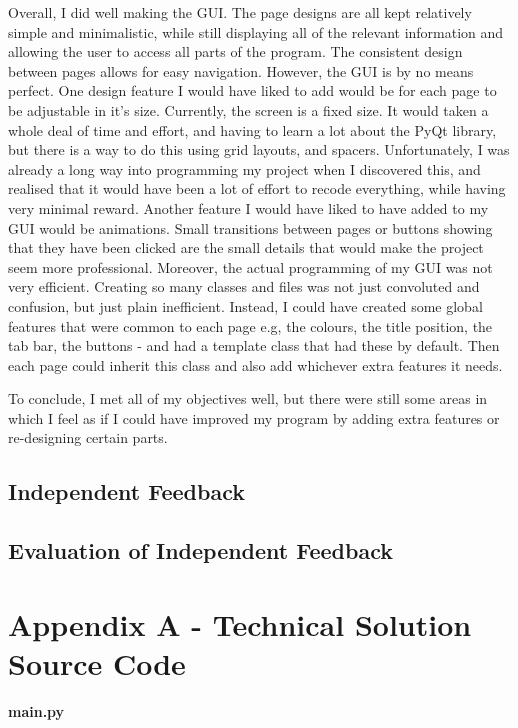 \documentclass{article}
\begin{document}
Overall, I did well making the GUI. The page designs are all kept relatively simple and minimalistic, while still displaying all of the relevant information and allowing the user to access all parts of the program. The consistent design between pages allows for easy navigation. However, the GUI is by no means perfect. One design feature I would have liked to add would be for each page to be adjustable in it's size. Currently, the screen is a fixed size. It would taken a whole deal of time and effort, and having to learn a lot about the PyQt library, but there is a way to do this using grid layouts, and spacers. Unfortunately, I was already a long way into programming my project when I discovered this, and realised that it would have been a lot of effort to recode everything, while having very minimal reward. Another feature I would have liked to have added to my GUI would be animations. Small transitions between pages or buttons showing that they have been clicked are the small details that would make the project seem more professional. Moreover, the actual programming of my GUI was not very efficient. Creating so many classes and files was not just convoluted and confusion, but just plain inefficient. Instead, I could have created some global features that were common to each page e.g, the colours, the title position, the tab bar, the buttons - and had a template class that had these by default. Then each page could inherit this class and also add whichever extra features it needs.

To conclude, I met all of my objectives well, but there were still some areas in which I feel as if I could have improved my program by adding extra features or re-designing certain parts.

\subsection{Independent Feedback}
\subsection{Evaluation of Independent Feedback}


\clearpage

\section{Appendix A - Technical Solution Source Code}
\textbf{main.py}
\end{document}
